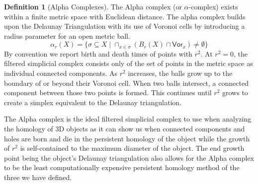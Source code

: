 \documentclass[ma]{uncgdissertationexp}
\theoremstyle{plain}
\theoremstyle{definition}
\newtheorem{definition}[theorem]{Definition}
\theoremstyle{remark}
\begin{document}
\begin{definition}[Alpha Complexes]
\par The Alpha complex (or $\alpha$-complex) exists within a finite metric space with Euclidean distance. The alpha complex builds upon the Delaunay Triangulation with its use of Voronoi cells by introducing a radius parameter for an open metric ball. 
$$\alpha_{r}(X)=\{\sigma \subseteq X \mid \cap_{x\in \sigma} (B_{r}(X) \cap \mathsf{Vor}_{x}) \not= \emptyset\}$$
By convention we report birth and death times of points with $r^{2}$. At $r^{2}=0$, the filtered simplicial complex consists only of the set of points in the metric space as individual connected components. As $r^{2}$ increases, the balls grow up to the boundary of or beyond their Voronoi cell. When two balls intersect, a connected component between those two points is formed. This continues until $r^{2}$ grows to create a simplex equivalent to the Delaunay triangulation.
\end{definition}

\par The Alpha complex is the ideal filtered simplicial complex to use when analyzing the homology of 3D objects as it can show us when connected components and holes are born and die in the persistent homology of the object while the growth of $r^{2}$ is self-contained to the maximum diameter of the object. The end growth point being the object's Delaunay triangulation also allows for the Alpha complex to be the least computationally expensive persistent homology method of the three we have defined.
\end{document}
